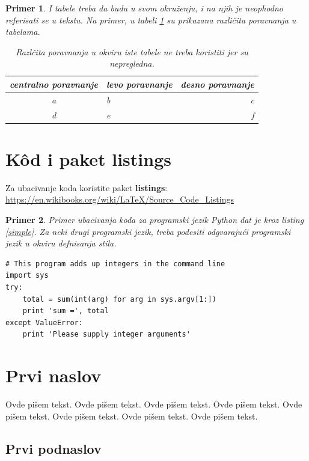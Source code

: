 \documentclass[a4paper]{article}
\newtheorem{primer}{Primer}[section]
\begin{document}
\begin{primer} I tabele treba da budu u svom okruženju, i na njih je neophodno referisati se u tekstu. Na primer, u tabeli \ref{tab:tabela1} su prikazana različita poravnanja u tabelama.

\begin{table}[h!]
\begin{center}
\caption{Razlčita poravnanja u okviru iste tabele ne treba koristiti jer su nepregledna.}
\begin{tabular}{|c|l|r|} \hline
centralno poravnanje& levo poravnanje& desno poravnanje\\ \hline
a &b&c\\ \hline
d &e&f\\ \hline
\end{tabular}
\label{tab:tabela1}
\end{center}
\end{table}

\end{primer}

\section{K\^{o}d i paket listings}
Za ubacivanje koda koristite paket \textbf{listings}:
\url{https://en.wikibooks.org/wiki/LaTeX/Source_Code_Listings}

\begin{primer}
Primer ubacivanja koda za programski jezik Python dat je kroz listing \ref{simple}. Za neki drugi programski jezik, treba podesiti odgvarajući programski jezik u okviru defnisanja stila.
\end{primer}
\begin{lstlisting}[caption={Primer ubacivanja koda u tekst},frame=single, label=simple]
# This program adds up integers in the command line
import sys
try:
    total = sum(int(arg) for arg in sys.argv[1:])
    print 'sum =', total
except ValueError:
    print 'Please supply integer arguments'
\end{lstlisting}


\section{Prvi naslov}
\label{sec:naslov1}


Ovde pišem tekst. 
Ovde pišem tekst. 
Ovde pišem tekst. 
Ovde pišem tekst. 
Ovde pišem tekst. 
Ovde pišem tekst. 
Ovde pišem tekst. 
Ovde pišem tekst. 


\subsection{Prvi podnaslov}
\label{subsec:podnaslov1}
\end{document}
